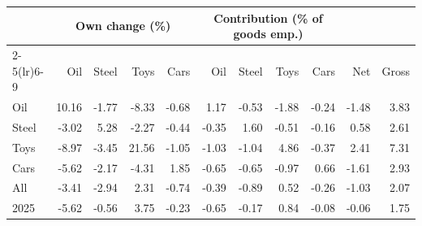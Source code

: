 \begin{tabular}{lrrrrrrrrrr}
\toprule
 & \multicolumn{4}{c}{Own change (\%)} & \multicolumn{4}{c}{Contribution (\% of goods emp.)} & & \\
\cmidrule(lr){2-5}\cmidrule(lr){6-9}
 & Oil & Steel & Toys & Cars & Oil & Steel & Toys & Cars & Net & Gross \\
\midrule
Oil & 10.16 & -1.77 & -8.33 & -0.68 & 1.17 & -0.53 & -1.88 & -0.24 & -1.48 & 3.83 \\
Steel & -3.02 & 5.28 & -2.27 & -0.44 & -0.35 & 1.60 & -0.51 & -0.16 & 0.58 & 2.61 \\
Toys & -8.97 & -3.45 & 21.56 & -1.05 & -1.03 & -1.04 & 4.86 & -0.37 & 2.41 & 7.31 \\
Cars & -5.62 & -2.17 & -4.31 & 1.85 & -0.65 & -0.65 & -0.97 & 0.66 & -1.61 & 2.93 \\
All & -3.41 & -2.94 & 2.31 & -0.74 & -0.39 & -0.89 & 0.52 & -0.26 & -1.03 & 2.07 \\
2025 & -5.62 & -0.56 & 3.75 & -0.23 & -0.65 & -0.17 & 0.84 & -0.08 & -0.06 & 1.75 \\
\bottomrule
\end{tabular}
